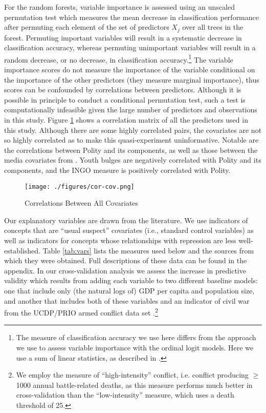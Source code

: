 \documentclass[12pt]{article}
\begin{document}
For the random forests, variable importance is assessed using an unscaled permutation test which measures the mean decrease in classification performance after permuting each element of the set of predictors $X_j$ over all trees in the forest. Permuting important variables will result in a systematic decrease in classification accuracy, whereas permuting unimportant variables will result in a random decrease, or no decrease, in classification accuracy.\footnote{The measure of classification accuracy we use here differs from the approach we use to assess variable importance with the ordinal logit models. Here we use a sum of linear statistics, as described in \citet{hothorn2006unbiased}.} The variable importance scores do not measure the importance of the variable conditional on the importance of the other predictors (they measure marginal importance), thus scores can be confounded by correlations between predictors. Although it is possible in principle to conduct a conditional permutation test, such a test is computationally infeasible given the large number of predictors and observations in this study. Figure \ref{fig:cor-cov} shows a correlation matrix of all the predictors used in this study. Although there are some highly correlated pairs, the covariates are not so highly correlated as to make this quasi-experiment uninformative. Notable are the correlations between Polity and its components, as well as those between the media covariates from \citet{RonRamosRodgers2005}. Youth bulges are negatively correlated with Polity and its components, and the INGO measure is positively correlated with Polity. 

\begin{figure}[!htpb]
\texttt{[image: ./figures/cor-cov.png]}
\caption{Correlations Between All Covariates} 
\label{fig:cor-cov}
\end{figure}

Our explanatory variables are drawn from the literature. We use indicators of concepts that are ``usual suspect'' covariates (i.e., standard control variables) as well as indicators for concepts whose relationships with repression are less well-established. Table \ref{tab:vars} lists the measures used below and the sources from which they were obtained. Full descriptions of these data can be found in the appendix. In our cross-validation analysis we assess the increase in predictive validity which results from adding each variable to two different baseline models: one that include only (the natural logs of) GDP per capita and population size, and another that includes both of these variables and an indicator of civil war from the UCDP/PRIO armed conflict data set \citep{ThemnerWallensteen2012}.\footnote{We employ the measure of ``high-intensity'' conflict, i.e. conflict producing $\geq$ 1000 annual battle-related deaths, as this measure performs much better in cross-validation than the ``low-intensity'' measure, which uses a death threshold of 25.}
\end{document}
